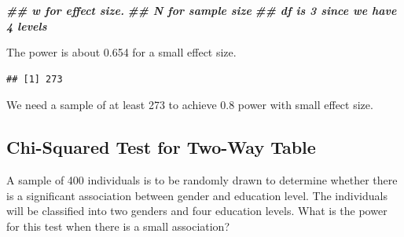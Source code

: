 \documentclass[
]{book}
\newenvironment{Shaded}{\begin{snugshade}}{\end{snugshade}}
\newcommand{\AttributeTok}[1]{\textcolor[rgb]{0.13,0.29,0.53}{#1}}
\newcommand{\DecValTok}[1]{\textcolor[rgb]{0.00,0.00,0.81}{#1}}
\newcommand{\DocumentationTok}[1]{\textcolor[rgb]{0.56,0.35,0.01}{\textbf{\textit{#1}}}}
\newcommand{\FloatTok}[1]{\textcolor[rgb]{0.00,0.00,0.81}{#1}}
\newcommand{\FunctionTok}[1]{\textcolor[rgb]{0.13,0.29,0.53}{\textbf{#1}}}
\newcommand{\NormalTok}[1]{#1}
\newcommand{\SpecialCharTok}[1]{\textcolor[rgb]{0.81,0.36,0.00}{\textbf{#1}}}
\theoremstyle{definition}
\theoremstyle{definition}
\theoremstyle{definition}
\theoremstyle{definition}
\theoremstyle{remark}
\begin{document}
\begin{Shaded}
\begin{Highlighting}[]
\DocumentationTok{\#\# w for effect size.}
\DocumentationTok{\#\# N for sample size}
\DocumentationTok{\#\# df is 3 since we have 4 levels}
\end{Highlighting}
\end{Shaded}

The power is about 0.654 for a small effect size.

\begin{Shaded}
\end{Shaded}

\begin{verbatim}
## [1] 273
\end{verbatim}

We need a sample of at least 273 to achieve 0.8 power with small effect size.

\hypertarget{chi-squared-test-for-two-way-table-1}{%
\subsection{Chi-Squared Test for Two-Way Table}\label{chi-squared-test-for-two-way-table-1}}

A sample of 400 individuals is to be randomly drawn to determine whether there is a significant association between gender and education level. The individuals will be classified into two genders and four education levels. What is the power for this test when there is a small association?

\begin{Shaded}
\end{Shaded}
\end{document}
